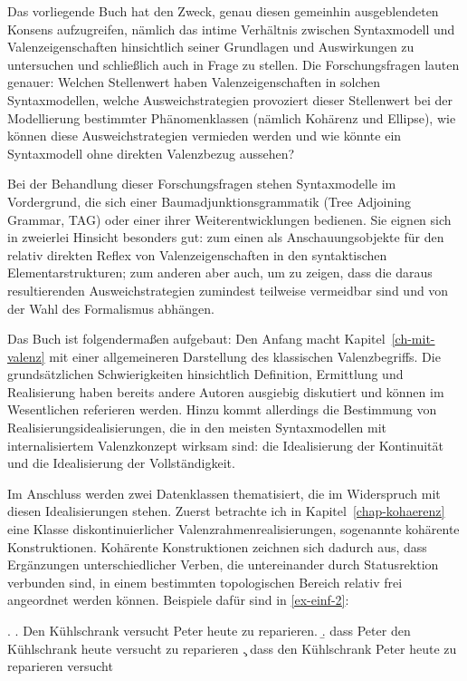 Das vorliegende Buch hat den Zweck, genau diesen gemeinhin ausgeblendeten Konsens aufzugreifen, nämlich das intime Verhältnis zwischen Syntaxmodell und Valenzeigenschaften hinsichtlich seiner Grundlagen und Auswirkungen zu untersuchen und schlie\ss lich auch in Frage zu stellen. Die Forschungsfragen lauten genauer: Welchen Stellenwert haben Valenzeigenschaften in solchen Syntaxmodellen, welche Ausweichstrategien provoziert dieser Stellenwert bei der Modellierung bestimmter Phänomenklassen (nämlich Kohärenz und Ellipse), wie können diese Ausweichstrategien vermieden werden und wie könnte ein Syntaxmodell ohne direkten Valenzbezug aussehen?

Bei der Behandlung dieser Forschungsfragen stehen Syntaxmodelle im Vordergrund, die sich einer Baumadjunktionsgrammatik (Tree Adjoining Grammar, TAG) oder einer ihrer Weiterentwicklungen bedienen. Sie eignen sich in zweierlei Hinsicht besonders gut: zum einen als Anschauungsobjekte für den relativ direkten Reflex von Valenzeigenschaften in den syntaktischen Elementarstrukturen; zum anderen aber auch, um zu zeigen, dass die daraus resultierenden Ausweichstrategien zumindest teilweise vermeidbar sind und von der Wahl des Formalismus abhängen. %

Das Buch ist folgendermaßen aufgebaut: Den Anfang macht Kapitel~\ref{ch-mit-valenz} mit einer allgemeineren Darstellung des klassischen Valenzbegriffs. Die grundsätzlichen Schwierigkeiten hinsichtlich Definition, Ermittlung und Realisierung haben bereits andere Autoren ausgiebig diskutiert und können im Wesentlichen referieren werden. Hinzu kommt allerdings die Bestimmung von Realisierungsidealisierungen, die in den meisten Syntaxmodellen mit internalisiertem Valenzkonzept wirksam sind: die Idealisierung der Kontinuität und die Idealisierung der Vollständigkeit.

Im Anschluss werden zwei Datenklassen thematisiert, die im Widerspruch mit diesen Idealisierungen stehen. Zuerst betrachte ich in Kapitel~\ref{chap-kohaerenz} eine Klasse diskontinuierlicher Valenzrahmenrealisierungen, sogenannte kohärente Konstruktionen. Kohärente Konstruktionen zeichnen sich dadurch aus, dass Ergänzungen unterschiedlicher Verben, die untereinander durch Statusrektion verbunden sind, in einem bestimmten topologischen Bereich relativ frei angeordnet werden können. Beispiele dafür sind in \ref{ex-einf-2}:     
 
  \ex. \label{ex-einf-2}
  \a. \label{ex-einf-2-a}Den Kühlschrank versucht Peter heute zu reparieren.
  \b. \label{ex-einf-2-b}dass Peter den Kühlschrank heute versucht zu reparieren
  \c. \label{ex-einf-2-c}dass den Kühlschrank Peter heute zu reparieren versucht

